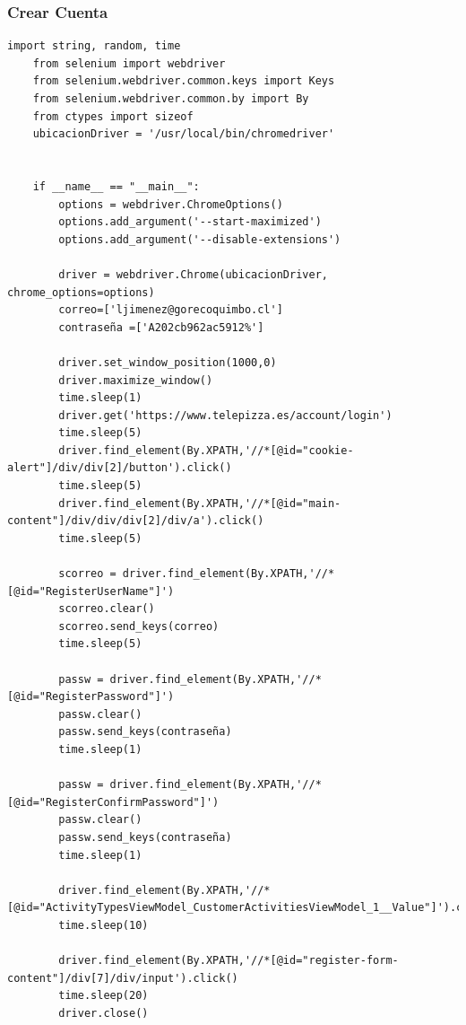 \documentclass[]{article}
\begin{document}
\subsubsection{Crear Cuenta}

\begin{lstlisting}[lenguaje=py]
    import string, random, time
    from selenium import webdriver
    from selenium.webdriver.common.keys import Keys
    from selenium.webdriver.common.by import By
    from ctypes import sizeof
    ubicacionDriver = '/usr/local/bin/chromedriver'
    
    
    if __name__ == "__main__":
        options = webdriver.ChromeOptions()
        options.add_argument('--start-maximized')
        options.add_argument('--disable-extensions')
    
        driver = webdriver.Chrome(ubicacionDriver, chrome_options=options)
        correo=['ljimenez@gorecoquimbo.cl']
        contraseña =['A202cb962ac5912%']
    
        driver.set_window_position(1000,0)
        driver.maximize_window()
        time.sleep(1)
        driver.get('https://www.telepizza.es/account/login')
        time.sleep(5)
        driver.find_element(By.XPATH,'//*[@id="cookie-alert"]/div/div[2]/button').click()
        time.sleep(5)
        driver.find_element(By.XPATH,'//*[@id="main-content"]/div/div/div[2]/div/a').click()
        time.sleep(5)
    
        scorreo = driver.find_element(By.XPATH,'//*[@id="RegisterUserName"]')
        scorreo.clear()
        scorreo.send_keys(correo)
        time.sleep(5)
    
        passw = driver.find_element(By.XPATH,'//*[@id="RegisterPassword"]')
        passw.clear()
        passw.send_keys(contraseña)
        time.sleep(1)
        
        passw = driver.find_element(By.XPATH,'//*[@id="RegisterConfirmPassword"]')
        passw.clear()
        passw.send_keys(contraseña)
        time.sleep(1)
        
        driver.find_element(By.XPATH,'//*[@id="ActivityTypesViewModel_CustomerActivitiesViewModel_1__Value"]').click()
        time.sleep(10)
        
        driver.find_element(By.XPATH,'//*[@id="register-form-content"]/div[7]/div/input').click()
        time.sleep(20)
        driver.close()
\end{lstlisting}
\end{document}
